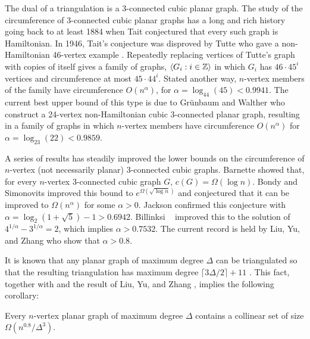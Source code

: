 \documentclass{patmorin}
\newcommand{\note}[2]{{\color{red}[#1:~#2]}}
\begin{document}
The dual of a triangulation is a 3-connected cubic planar graph.
The study of the circumference of 3-connected cubic planar graphs
has a long and rich history going back to at least 1884 when Tait
\cite{tait:remarks} conjectured that every such graph is Hamiltonian.  In
1946, Tait's conjecture was disproved by Tutte who gave a non-Hamiltonian
46-vertex example \cite{tutte:on}.  Repeatedly replacing vertices of
Tutte's graph with copies of itself gives a family of graphs, $\langle G_i:i\in
\mathbb{Z}\rangle$ in which $G_i$ has $46\cdot 45^i$ vertices and circumference at
most $45\cdot44^i$.  Stated another way, $n$-vertex members of the
family have circumference $O(n^\alpha)$, for $\alpha=\log_{44}(45) < 0.9941$.
The current best upper bound of this type is due to Gr\"unbaum and
Walther \cite{grunbaum.walther:shortness} who construct a 24-vertex
non-Hamiltonian cubic 3-connected planar graph, resulting in a family
of graphs in which $n$-vertex members have circumference $O(n^{\alpha})$
for $\alpha=\log_{23}(22)< 0.9859$.

A series of results has steadily improved the lower bounds on the
circumference of $n$-vertex  (not necessarily planar) 3-connected
cubic graphs.  Barnette \cite{barnette:trees} showed that, for
every $n$-vertex 3-connected cubic graph $G$, $c(G)=\Omega(\log n)$.
Bondy and Simonovits \cite{bondy.simonovits:longest} improved this bound
to $e^{\Omega(\sqrt{\log n})}$ and conjectured that it can be improved
to $\Omega(n^\alpha)$ for some $\alpha>0$.  Jackson \cite{jackson:longest}
confirmed this conjecture with $\alpha=\log_2(1+\sqrt{5})-1 > 0.6942$.
Billinksi \etal\ \cite{bilinksi.jackson.ea:circumference} improved
this to the solution of $4^{1/\alpha}-3^{1/\alpha}=2$, which implies
$\alpha>0.7532$.  The current record is held by Liu, Yu, and Zhang
\cite{liu.yu.zhang:circumference} who show that $\alpha>0.8$.

It is known that any planar graph of maximum degree $\Delta$ can be
triangulated so that the resulting triangulation has maximum degree
$\lceil 3\Delta/2\rceil+11$ \cite{kant.bodlaender:triangulating}. This
fact, together with  and the result of Liu, Yu, and Zhang
\cite{liu.yu.zhang:circumference}, implies the following corollary:

\begin{cor}
  Every $n$-vertex planar graph of maximum degree $\Delta$ contains a
  collinear set of size $\Omega(n^{0.8}/\Delta^3)$.
\end{cor}

\end{document}
